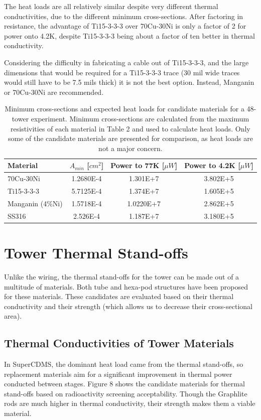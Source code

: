 \documentclass{article}
\begin{document}
The heat loads are all relatively similar despite very different thermal conductivities, due to the different minimum cross-sections. After factoring in resistance, the advantage of Ti15-3-3-3 over 70Cu-30Ni is only a factor of 2 for power onto 4.2K, despite Ti15-3-3-3 being about a factor of ten better in thermal conductivity.

Considering the difficulty in fabricating a cable out of Ti15-3-3-3, and the large dimensions that would be required for a Ti15-3-3-3 trace (30 mil wide traces would still have to be 7.5 mils thick) it is not the best option. Instead, Manganin or 70Cu-30Ni are recommended.

\begin{table}[h]
\centering
\begin{threeparttable}
\begin{tabular}{l|ccc}
\toprule
Material & $A_{min}$ [$cm^2$] & Power to 77K [$\mu W$] & Power to 4.2K [$\mu W$] \\
\midrule
70Cu-30Ni & 1.2680E-4 & 1.301E+7 & 3.802E+5 \\
Ti15-3-3-3 & 5.7125E-4 & 1.374E+7 & 1.605E+5 \\
Manganin (4\%Ni) & 1.5718E-4 & 1.0220E+7 & 2.862E+5 \\
SS316 & 2.526E-4 & 1.187E+7 & 3.180E+5 \\
\bottomrule
\end{tabular}
\end{threeparttable}
\caption{Minimum cross-sections and expected heat loads for candidate materials for a 48-tower experiment. Minimum cross-sections are calculated from the maximum resistivities of each material in Table 2 and used to calculate heat loads.  Only some of the candidate materials are presented for comparison, as heat loads are not a major concern.}
\end{table}


\section{Tower Thermal Stand-offs}
Unlike the wiring, the thermal stand-offs for the tower can be made out of a multitude of materials. Both tube and hexa-pod structures have been proposed for these materials. These candidates are evaluated based on their thermal conductivity and their strength (which allows us to decrease their cross-sectional area).

\subsection{Thermal Conductivities of Tower Materials}
In SuperCDMS, the dominant heat load came from the thermal stand-offs, so replacement materials aim for a significant improvement in thermal power conducted between stages. Figure 8 shows the candidate materials for thermal stand-offs based on radioactivity screening acceptability. Though the Graphlite rods are much higher in thermal conductivity, their strength makes them a viable material.
\end{document}
